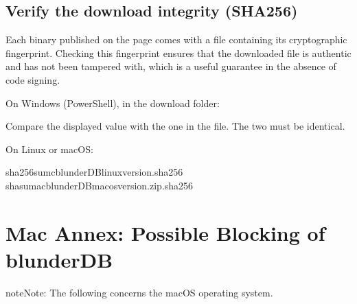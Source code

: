 \documentclass[letterpaper,10pt,english]{sphinxmanual}
\begin{document}
\subsection{Verify the download integrity (SHA256)}
\label{\detokenize{annexe_windows_securite:verifier-l-integrite-du-telechargement-sha256}}
\sphinxAtStartPar
Each binary published on the  page comes with a  file containing its cryptographic fingerprint. Checking this fingerprint ensures that the downloaded file is authentic and has not been tampered with, which is a useful guarantee in the absence of code signing.

\sphinxAtStartPar
On Windows (PowerShell), in the download folder:

\begin{sphinxVerbatim}[commandchars=\\\{\}]
   
\end{sphinxVerbatim}

\sphinxAtStartPar
Compare the displayed value with the one in the  file. The two must be identical.

\sphinxAtStartPar
On Linux or macOS:

\begin{sphinxVerbatim}[commandchars=\\\{\}]
sha256sum\PYGZhy{}cblunderDB\PYGZhy{}linux\PYGZhy{}\PYGZlt{}version\PYGZgt{}.sha256
shasum\PYGZhy{}a\PYGZhy{}cblunderDB\PYGZhy{}macos\PYGZhy{}\PYGZlt{}version\PYGZgt{}.zip.sha256
\end{sphinxVerbatim}

\sphinxstepscope


\section{Mac Annex: Possible Blocking of blunderDB}
\label{\detokenize{annexe_mac_securite:annexe-mac-blocage-eventuel-de-blunderdb}}\label{\detokenize{annexe_mac_securite:annexe-mac-malware}}\label{\detokenize{annexe_mac_securite::doc}}
\begin{sphinxadmonition}{note}{Note:}
\sphinxAtStartPar
The following concerns the macOS operating system.
\end{sphinxadmonition}
\end{document}
